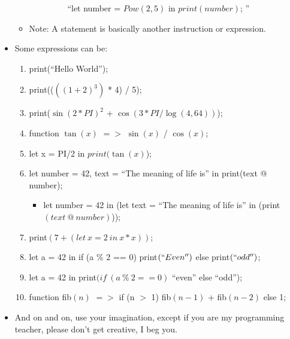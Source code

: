 \begin{itemize}
\begin{itemize}
\begin{itemize}
\begin{description}
                            \item[] ``let number = $Pow(2,5)$ in $print(number)$; ''
                        \end{description}
                    \end{itemize}
                \item Note: A statement is basically another instruction or expression.
            \end{itemize}
        \item Some expressions can be:
            \begin{enumerate}
                \item print{(``Hello World'')};
                \item print{(($({(1 + 2)} ^ 3)$ * 4) / 5)};
                \item print{($\sin{(2 * PI)}^2$ + $\cos(3 * PI / \log(4, 64))$)};
                \item function $\tan{(x)}$ $=>$ $\sin{(x)}$ / $\cos{(x)}$;
                \item let x = PI/2 in $print(\tan(x)$);
                \item let number = 42, text = ``The meaning of life is'' in print{(text @ number)};
                    \begin{itemize}
                        \item let number = 42 in (let text = ``The meaning of life is'' in (print$(text \ @ \ number)$));
                    \end{itemize}
                \item print$(7 + (let \ x = 2 \ in \ x * x))$;
                \item let a = 42 in if (a \% 2 == 0) print$(``Even'')$ else print$(``odd'')$;
                \item let a = 42 in print$(if \ (a \ \% \ 2 == 0)$ ``even'' else ``odd'');
                \item function fib$(n)$ $=>$ if (n $>$ 1) fib$(n-1)$ + fib$(n-2)$ else 1;
            \end{enumerate}
        \item And on and on, use your imagination, except if you are my programming teacher, please don't get creative, I beg you.
     \end{itemize}